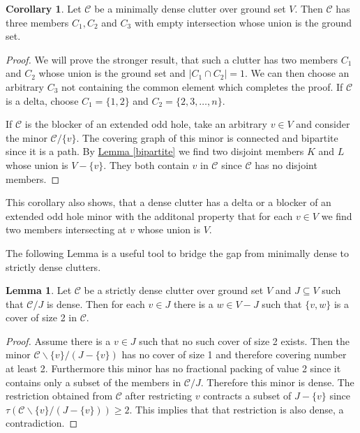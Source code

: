 \documentclass[a4paper, 12pt, twoside=false]{scrbook}
\theoremstyle{definition}
\newtheorem{corollary}[theorem]{Corollary}
\newtheorem{lemma}[theorem]{Lemma}
\begin{document}
   \begin{corollary}\label{threemember}
       Let $\mathcal{C}$ be a minimally dense clutter over ground set $V$.
       Then $\mathcal{C}$ has three members $C_1, C_2$ and $C_3$ with empty intersection whose union is the ground set.
   \end{corollary}

   \begin{proof}
       We will prove the stronger result, that such a clutter has two members $C_1$ and $C_2$ whose union is the ground set and $|C_1 \cap C_2|=1$.
       We can then choose an arbitrary $C_3$ not containing the common element which completes the proof.
       If $\mathcal{C}$ is a delta, choose $C_1=\{1,2\}$ and $C_2=\{2,3,\ldots,n\}$.

       If $\mathcal{C}$ is the blocker of an extended odd hole, take an arbitrary $v \in V$ and consider the minor $\mathcal{C} / \{v\}$.
       The covering graph of this minor is connected and bipartite since it is a path.
       By \hyperref[bipartite]{Lemma \ref*{bipartite}} we find two disjoint members $K$ and $L$ whose union is $V-\{v\}$.
       They both contain $v$ in $\mathcal{C}$ since $\mathcal{C}$ has no disjoint members.
   \end{proof}

   This corollary also shows, that a dense clutter has a delta or a blocker of an extended odd hole minor with the additonal property that for each $v \in V$ we find two members intersecting at $v$ whose union is $V$.

   The following Lemma is a useful tool to bridge the gap from minimally dense to strictly dense clutters.
   \begin{lemma}\label{covers}
       Let $\mathcal{C}$ be a strictly dense clutter over ground set $V$ and $J \subseteq V$ such that $\mathcal{C} / J$ is dense.
       Then for each $v \in J$ there is a $w \in V-J$ such that $\{v,w\}$ is a cover of size 2 in $\mathcal{C}$.
   \end{lemma}

   \begin{proof}
       Assume there is a $v \in J$ such that no such cover of size 2 exists.
       Then the minor $\mathcal{C} \backslash \{v\} / (J-\{v\})$ has no cover of size 1 and therefore covering number at least 2.
       Furthermore this minor has no fractional packing of value 2 since it contains only a subset of the members in $\mathcal{C} / J$.
       Therefore this minor is dense.
       The restriction obtained from $\mathcal{C}$ after restricting $v$ contracts a subset of $J-\{v\}$ since $\tau(\mathcal{C} \backslash \{v\} / (J-\{v\}))\geq 2$.
       This implies that that restriction is also dense, a contradiction.
   \end{proof}
\end{document}
